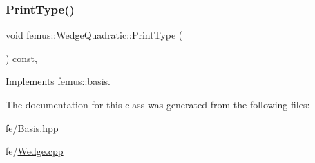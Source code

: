 \mbox{\label{classfemus_1_1_wedge_quadratic_a418fac73334350c6efa893644208de73}} 
\subsubsection{\texorpdfstring{Print\+Type()}{PrintType()}}
{\footnotesize\ttfamily void femus\+::\+Wedge\+Quadratic\+::\+Print\+Type (\begin{DoxyParamCaption}{ }\end{DoxyParamCaption}) const\hspace{0.3cm}{\ttfamily [inline]}, {\ttfamily [virtual]}}



Implements \mbox{\hyperlink{classfemus_1_1basis_abbae7bf8f31ec5793c911bc6d4ea0572}{femus\+::basis}}.



The documentation for this class was generated from the following files\+:\begin{DoxyCompactItemize}
\item 
fe/\mbox{\hyperlink{_basis_8hpp}{Basis.\+hpp}}\item 
fe/\mbox{\hyperlink{_wedge_8cpp}{Wedge.\+cpp}}\end{DoxyCompactItemize}
